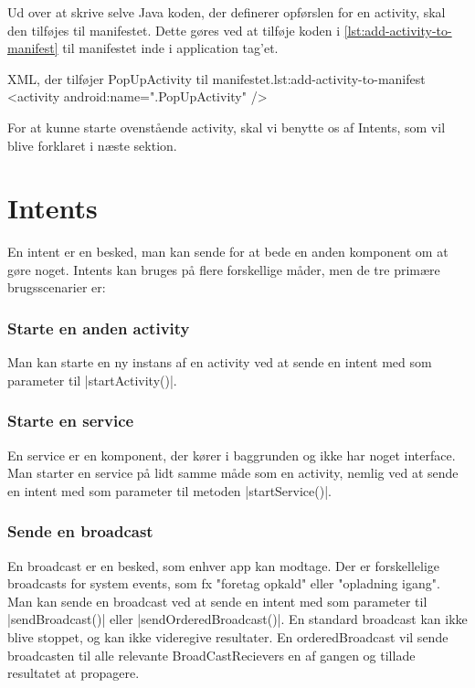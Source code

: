 Ud over at skrive selve Java koden, der definerer opførslen for en activity, skal den tilføjes til manifestet. Dette gøres ved at tilføje koden i \autoref{lst:add-activity-to-manifest} til manifestet inde i application tag'et.

\begin{XmlCode}{XML, der tilføjer PopUpActivity til manifestet.}{lst:add-activity-to-manifest}
	<activity android:name=".PopUpActivity" />
\end{XmlCode}

For at kunne starte ovenstående activity, skal vi benytte os af Intents, som vil blive forklaret i næste sektion.


\section{Intents}

En intent er en besked, man kan sende for at bede en anden komponent om at gøre noget. Intents kan bruges på flere forskellige måder, men de tre primære brugsscenarier er:

\subsubsection{Starte en anden activity}

Man kan starte en ny instans af en activity ved at sende en intent med som parameter til \JavaInline|startActivity()|. 

\subsubsection{Starte en service}

En service er en komponent, der kører i baggrunden og ikke har noget interface. Man starter en service på lidt samme måde som en activity, nemlig ved at sende en intent med som parameter til metoden \JavaInline|startService()|.

\subsubsection{Sende en broadcast}

En broadcast er en besked, som enhver app kan modtage. Der er forskellelige broadcasts for system events, som fx "foretag opkald" eller "opladning igang". Man kan sende en broadcast ved at sende en intent med som parameter til \JavaInline|sendBroadcast()| eller \JavaInline|sendOrderedBroadcast()|.
En standard broadcast kan ikke blive stoppet, og kan ikke videregive resultater. En orderedBroadcast vil sende broadcasten til alle relevante BroadCastRecievers en af gangen og tillade resultatet at propagere.

